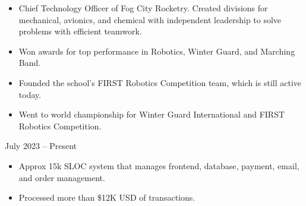 \documentclass[10pt,a4paper,ragged2e,withhyper]{altacv}
\begin{document}
\begin{paracol}{2}
        
            \begin{itemize}
                \item Chief Technology Officer of Fog City Rocketry. Created divisions for mechanical, avionics, and chemical with independent leadership to solve problems with efficient teamwork.
            \end{itemize}
            \divider
            
            \begin{itemize}
                \item Won awards for top performance in Robotics, Winter Guard, and Marching Band.
                \item Founded the school's FIRST Robotics Competition team, which is still active today.
                \item Went to world championship for Winter Guard International and FIRST Robotics Competition.
            \end{itemize}
        
        
            
        
        
            {}{July 2023 -- Present}{}
            \begin{itemize}
                \item Approx 15k SLOC system that manages frontend, database, payment, email, and order management.
                \item Processed more than \$12K USD of transactions.
            \end{itemize}
        

\end{paracol}
\end{document}
